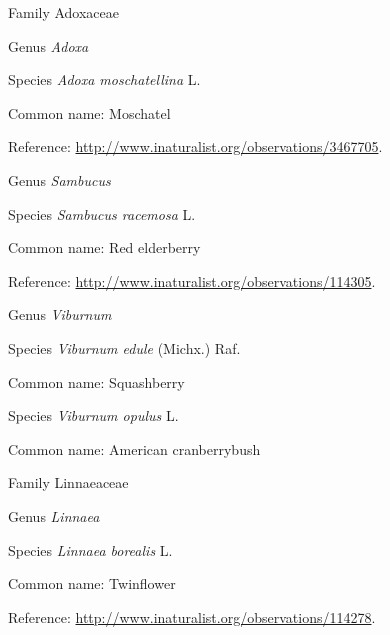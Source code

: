 \documentclass[9pt, article]{memoir}
\begin{document}
\begin{multicols}{2}
\vspace{6pt}\noindent\hspace{24pt}Family Adoxaceae


\vspace{6pt}\noindent\hspace{30pt}Genus \textit{Adoxa}


\vspace{6pt}\noindent\hspace{36pt}Species \textit{Adoxa moschatellina} L.


Common name: Moschatel

Reference: 
\url{http://www.inaturalist.org/observations/3467705}.

\vspace{6pt}\noindent\hspace{30pt}Genus \textit{Sambucus}


\vspace{6pt}\noindent\hspace{36pt}Species \textit{Sambucus racemosa} L.


Common name: Red elderberry

Reference: 
\url{http://www.inaturalist.org/observations/114305}.

\vspace{6pt}\noindent\hspace{30pt}Genus \textit{Viburnum}


\vspace{6pt}\noindent\hspace{36pt}Species \textit{Viburnum edule} (Michx.) Raf.


Common name: Squashberry

\vspace{6pt}\noindent\hspace{36pt}Species \textit{Viburnum opulus} L.


Common name: American cranberrybush

\vspace{6pt}\noindent\hspace{24pt}Family Linnaeaceae


\vspace{6pt}\noindent\hspace{30pt}Genus \textit{Linnaea}


\vspace{6pt}\noindent\hspace{36pt}Species \textit{Linnaea borealis} L.


Common name: Twinflower

Reference: 
\url{http://www.inaturalist.org/observations/114278}.


\end{multicols}
\end{document}
